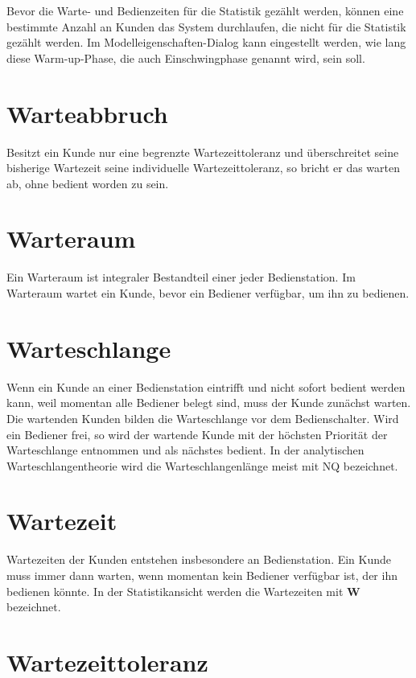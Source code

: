 Bevor die Warte- und Bedienzeiten für die Statistik gezählt werden, können eine bestimmte Anzahl an Kunden
das System durchlaufen, die nicht für die Statistik gezählt werden. Im
Modelleigenschaften-Dialog kann eingestellt werden, wie lang diese
Warm-up-Phase, die auch Einschwingphase genannt wird, sein soll.

\section*{Warteabbruch}


Besitzt ein Kunde nur eine begrenzte Wartezeittoleranz und überschreitet seine bisherige Wartezeit
seine individuelle Wartezeittoleranz, so bricht er das warten ab, ohne bedient worden zu sein.

\section*{Warteraum}


Ein Warteraum ist integraler Bestandteil einer jeder Bedienstation.
Im Warteraum wartet ein Kunde, bevor ein Bediener verfügbar, um ihn zu bedienen.

\section*{Warteschlange}


Wenn ein Kunde an einer Bedienstation eintrifft und
nicht sofort bedient werden kann, weil momentan alle Bediener belegt sind, muss der Kunde zunächst warten.
Die wartenden Kunden bilden die Warteschlange vor dem Bedienschalter. Wird ein Bediener frei, so wird
der wartende Kunde mit der höchsten Priorität der Warteschlange entnommen und als nächstes bedient.
In der analytischen Warteschlangentheorie wird die
Warteschlangenlänge meist mit NQ bezeichnet.

\section*{Wartezeit}


Wartezeiten der Kunden entstehen insbesondere an Bedienstation.
Ein Kunde muss immer dann warten, wenn momentan kein Bediener verfügbar ist, der ihn bedienen könnte.
In der Statistikansicht werden die Wartezeiten mit \textbf{W} bezeichnet.

\section*{Wartezeittoleranz}


